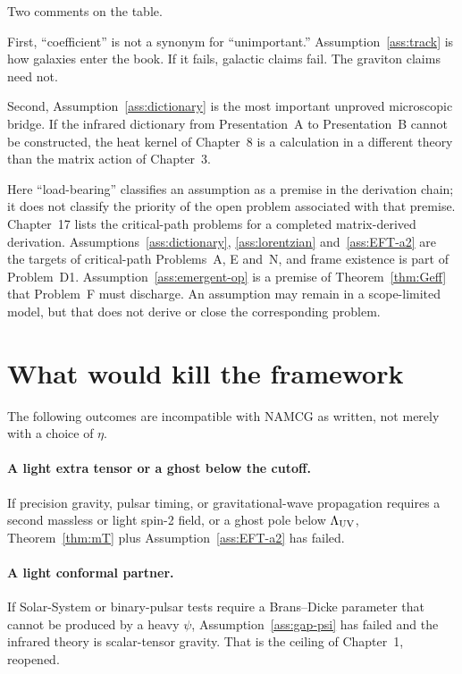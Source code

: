 Two comments on the table.

First, ``coefficient'' is not a synonym for ``unimportant.''
Assumption~\ref{ass:track} is how galaxies enter the book. If it
fails, galactic claims fail. The graviton claims need not.

Second, Assumption~\ref{ass:dictionary} is the most important
unproved microscopic bridge. If the infrared dictionary from
Presentation~A to Presentation~B cannot be constructed, the heat
kernel of Chapter~8 is a calculation in a different theory than
the matrix action of Chapter~3.

Here ``load-bearing'' classifies an assumption as a premise in the
derivation chain; it does not classify the priority of the open
problem associated with that premise. Chapter~17 lists the
critical-path problems for a completed matrix-derived derivation.
Assumptions~\ref{ass:dictionary}, \ref{ass:lorentzian}
and~\ref{ass:EFT-a2} are the targets of critical-path Problems~A,
E and~N, and frame existence is part of Problem~D1.
Assumption~\ref{ass:emergent-op} is a premise of
Theorem~\ref{thm:Geff} that Problem~F must discharge. An assumption
may remain in a scope-limited model, but that does not derive or
close the corresponding problem.

\section{What would kill the framework}
\label{sec:ch16-kill}

The following outcomes are incompatible with NAMCG as written,
not merely with a choice of \(\eta\).

\paragraph{A light extra tensor or a ghost below the cutoff.}
If precision gravity, pulsar timing, or gravitational-wave
propagation requires a second massless or light spin-2 field, or
a ghost pole below \(\Lambda_{\mathrm{UV}}\), Theorem~\ref{thm:mT} plus
Assumption~\ref{ass:EFT-a2} has failed.

\paragraph{A light conformal partner.}
If Solar-System or binary-pulsar tests require a Brans--Dicke
parameter that cannot be produced by a heavy \(\psi\), 
Assumption~\ref{ass:gap-psi} has failed and the infrared theory
is scalar-tensor gravity. That is the ceiling of Chapter~1,
reopened.

